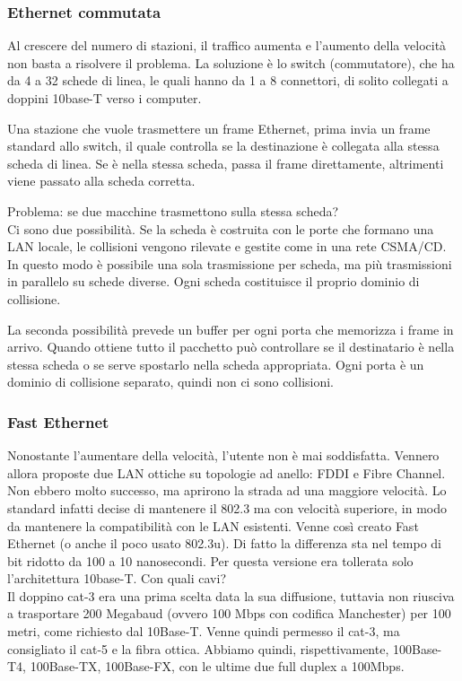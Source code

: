 \subsubsection{Ethernet commutata}
Al crescere del numero di stazioni, il traffico aumenta e l'aumento della velocità non basta a risolvere il problema.
La soluzione è lo switch (commutatore), che ha da 4 a 32 schede di linea, le quali hanno da 1 a 8 connettori, di solito collegati a doppini 10base-T verso i computer.

Una stazione che vuole trasmettere un frame Ethernet, prima invia un frame standard allo switch, il quale controlla se la destinazione è collegata alla stessa scheda di linea.
Se è nella stessa scheda, passa il frame direttamente, altrimenti viene passato alla scheda corretta.

Problema: se due macchine trasmettono sulla stessa scheda? \\
Ci sono due possibilità.
Se la scheda è costruita con le porte che formano una LAN locale, le collisioni vengono rilevate e gestite come in una rete CSMA/CD.
In questo modo è possibile una sola trasmissione per scheda, ma più trasmissioni in parallelo su schede diverse.
Ogni scheda costituisce il proprio dominio di collisione.

La seconda possibilità prevede un buffer per ogni porta che memorizza i frame in arrivo.
Quando ottiene tutto il pacchetto può controllare se il destinatario è nella stessa scheda o se serve spostarlo nella scheda appropriata.
Ogni porta è un dominio di collisione separato, quindi non ci sono collisioni.

\subsubsection{Fast Ethernet}
Nonostante l'aumentare della velocità, l'utente non è mai soddisfatta. 
Vennero allora proposte due LAN ottiche su topologie ad anello: FDDI e Fibre Channel.
Non ebbero molto successo, ma aprirono la strada ad una maggiore velocità.
Lo standard infatti decise di mantenere il 802.3 ma con velocità superiore, in modo da mantenere la compatibilità con le LAN esistenti.
Venne così creato Fast Ethernet (o anche il poco usato 802.3u). 
Di fatto la differenza sta nel tempo di bit ridotto da 100 a 10 nanosecondi.
Per questa versione era tollerata solo l'architettura 10base-T. Con quali cavi?\\
Il doppino cat-3 era una prima scelta data la sua diffusione, tuttavia non riusciva a trasportare 200 Megabaud (ovvero 100 Mbps con codifica Manchester) per 100 metri, come richiesto dal 10Base-T.
Venne quindi permesso il cat-3, ma consigliato il cat-5 e la fibra ottica. Abbiamo quindi, rispettivamente, 100Base-T4, 100Base-TX, 100Base-FX, con le ultime due full duplex a 100Mbps.

